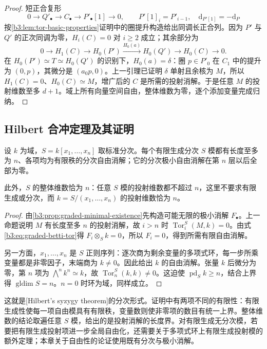 \begin{proof}
	短正合复形
	\[
		0\longrightarrow Q'_\bullet\longrightarrow C_\bullet \longrightarrow P'_\bullet[1]\longrightarrow0, \qquad P'[1]_i=P'_{i-1},\quad \mathrm{d}_{P'[1]}=-\mathrm{d}_P
	\]
	按\cref{b3:lem:tor-basic-properties}证明中的圈提升构造给出同调长正合列。因为 \(P'\) 与 \(Q'\) 的正次同调为零，\(H_i(C)=0\) 对 \(i\ge2\) 成立；其余部分为
	\[
		0\longrightarrow H_1(C)\longrightarrow H_0(P') \xrightarrow{H_0(a)}H_0(Q')\longrightarrow H_0(C) \longrightarrow0.
	\]
	在 \(H_0(P')\simeq T\simeq H_0(Q')\) 的识别下，\(H_0(a)=\delta\)：圈 \(p\in P'_0\) 在 \(C_1\) 中的提升为 \((0,p)\)，其微分是 \((a_0p,0)\)。上一引理已证明 \(\delta\) 单射且余核为 \(M\)，所以 \(H_1(C)=0\)、\(H_0(C)\simeq M\)，增广后的 \(C\) 是所需的投射消解。于是任意 \(M\) 的投射维数至多 \(d+1\)。域上所有向量空间自由，整体维数为零，逐个添加变量完成归纳。
\end{proof}

\subsection{Hilbert 合冲定理及其证明}
\label{b3:subsec:2102:02}

\begin{theorem}\label{b3:thm:hilbert-syzygy}
	设 \(k\) 为域，\(S=k[x_1,\ldots,x_n]\) 取标准分次。每个有限生成分次 \(S\) 模都有长度至多为 \(n\)、各项均为有限秩的分次自由消解；它的分次极小自由消解在第 \(n\) 层以后全部为零。

	此外，\(S\) 的整体维数恰为 \(n\)：任意 \(S\) 模的投射维数都不超过 \(n\)，这里不要求有限生成或分次，而 \(k=S/(x_1,\ldots,x_n)\) 的投射维数恰为 \(n\)。
\end{theorem}
\begin{proof}
	由\cref{b3:prop:graded-minimal-existence}先构造可能无限的极小消解 \(F_\bullet\)。上一命题说明 \(M\) 有长度至多 \(n\) 的投射消解，故 \(i>n\) 时 \(\operatorname{Tor}_i^S(M,k)=0\)。由式\eqref{b3:eq:graded-betti-tor}得 \(F_i\otimes_Sk=0\)，所以 \(F_i=0\)，得到所需有限自由消解。

	另一方面，\(x_1,\ldots,x_n\) 是 \(S\) 正则序列：逐次商为剩余变量的多项式环，每一步所乘变量都是非零因子，末端商为 \(k\ne0\)。因此给出 \(k\) 的自由消解。张量 \(k\) 后微分为零，第 \(n\) 项为 \(\bigwedge^n k^n\simeq k\)，故 \(\operatorname{Tor}_n^S(k,k)\ne0\)。这迫使 \(\operatorname{pd}_Sk\ge n\)，结合上界得 \(\operatorname{gldim}S=n\)。\(n=0\) 时环为域，同样成立。
\end{proof}

这就是[Hilbert's syzygy theorem]的分次形式。证明中有两项不同的有限性：有限生成性使每一项自由模具有有限秩，变量数则使非零项的数目有统一上界。整体维数的结论取遍任意 \(S\) 模，给出的是投射消解的长度界。对有限生成无分次模，若要把有限生成投射项进一步全局自由化，还需要关于多项式环上有限生成投射模的额外定理；本章关于自由性的论证使用既有分次与极小消解。

